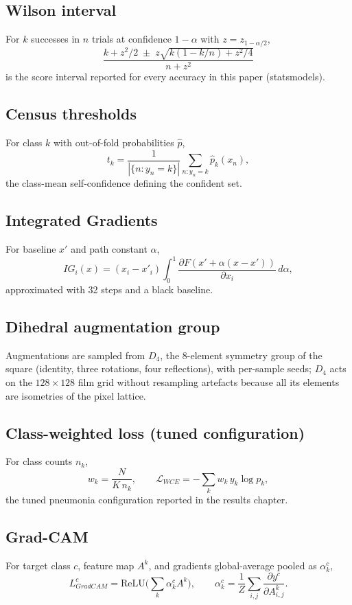 \subsection{Wilson interval}
For $k$ successes in $n$ trials at confidence $1-\alpha$ with
$z = z_{1-\alpha/2}$,
\begin{equation}
\frac{k + z^2/2 \;\pm\; z\sqrt{k(1-k/n) + z^2/4}}{n + z^2}
\end{equation}
is the score interval reported for every accuracy in this paper
(statsmodels).
\subsection{Census thresholds}
For class $k$ with out-of-fold probabilities $\hat p$,
\begin{equation}
t_k = \frac{1}{|\{n: y_n = k\}|} \sum_{n: y_n = k} \hat p_k(x_n),
\end{equation}
the class-mean self-confidence defining the confident set.
\subsection{Integrated Gradients}
For baseline $x'$ and path constant $\alpha$,
\begin{equation}
IG_i(x) = (x_i - x'_i) \int_{0}^{1}
\frac{\partial F(x' + \alpha (x - x'))}{\partial x_i}\, d\alpha ,
\end{equation}
approximated with 32 steps and a black baseline.
\subsection{Dihedral augmentation group}
Augmentations are sampled from $D_4$, the 8-element symmetry group of the
square (identity, three rotations, four reflections), with per-sample
seeds; $D_4$ acts on the $128\times128$ film grid without resampling
artefacts because all its elements are isometries of the pixel lattice.
\subsection{Class-weighted loss (tuned configuration)}
For class counts $n_k$,
\begin{equation}
w_k = \frac{N}{K\, n_k}, \qquad
\mathcal{L}_{WCE} = -\sum_k w_k\, y_k \log p_k ,
\end{equation}
the tuned pneumonia configuration reported in the results chapter.

\subsection{Grad-CAM}
For target class $c$, feature map $A^k$, and gradients global-average
pooled as $\alpha_k^c$,
\begin{equation}
L^c_{GradCAM} = \mathrm{ReLU}\Big(\sum_k \alpha_k^c A^k\Big), \qquad
\alpha_k^c = \frac{1}{Z}\sum_{i,j} \frac{\partial y^c}{\partial A^k_{i,j}} .
\end{equation}
